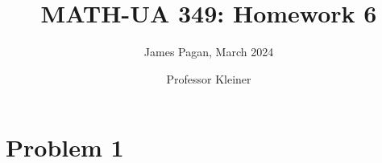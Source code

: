 \documentclass[11pt]{article}
\title{MATH-UA 349: Homework 6}
\author{James Pagan, March 2024}
\date{Professor Kleiner}
\begin{document}
\maketitle
\tableofcontents
\newpage


\section{Problem 1}

\end{document}
